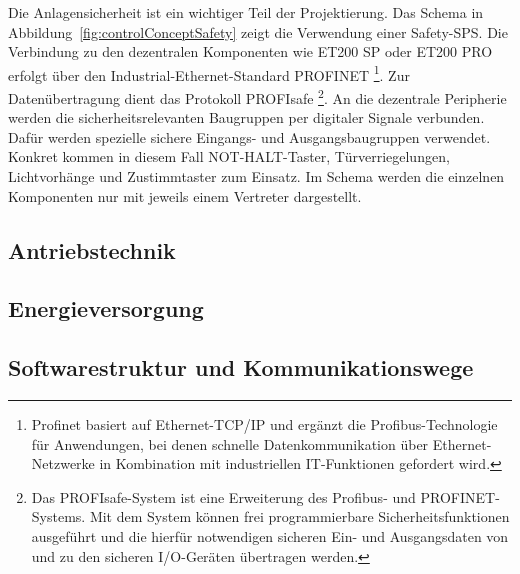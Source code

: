 Die Anlagensicherheit ist ein wichtiger Teil der Projektierung. Das Schema in Abbildung~\ref{fig:controlConceptSafety} zeigt die Verwendung einer Safety-SPS. Die Verbindung zu den dezentralen Komponenten wie ET200 SP oder ET200 PRO erfolgt über den Industrial-Ethernet-Standard PROFINET
\footnote{Profinet basiert auf Ethernet-TCP/IP und ergänzt die Profibus-Technologie für Anwendungen, bei denen schnelle Datenkommunikation über Ethernet-Netzwerke in Kombination mit industriellen IT-Funktionen gefordert wird. }.
Zur Datenübertragung dient das Protokoll PROFIsafe
\footnote{Das PROFIsafe-System ist eine Erweiterung des Profibus- und PROFINET-Systems. Mit dem System können frei programmierbare Sicherheitsfunktionen ausgeführt und die hierfür notwendigen sicheren Ein- und Ausgangsdaten von und zu den sicheren I/O-Geräten übertragen werden.}.
An die dezentrale Peripherie werden die sicherheitsrelevanten Baugruppen per digitaler Signale verbunden. Dafür werden spezielle sichere Eingangs- und Ausgangsbaugruppen verwendet. Konkret kommen in diesem Fall NOT-HALT-Taster, Türverriegelungen, Lichtvorhänge und Zustimmtaster zum Einsatz. Im Schema werden die einzelnen Komponenten nur mit jeweils einem Vertreter dargestellt.



\subsection{Antriebstechnik}

\subsection{Energieversorgung}

\subsection{Softwarestruktur und Kommunikationswege}
